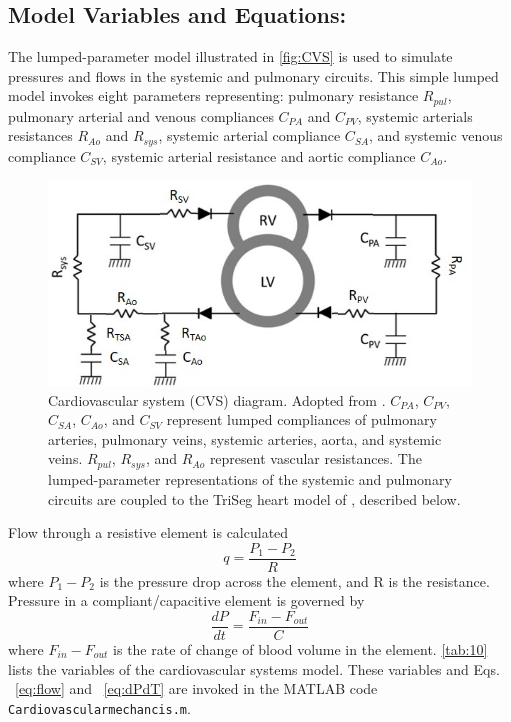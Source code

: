 \documentclass[fleqn,10pt]{physiome}
\begin{document}
\subsection{Model Variables and Equations:}

The lumped-parameter model illustrated in \autoref{fig:CVS} is used to simulate pressures and flows in the systemic and pulmonary circuits. This simple lumped model invokes eight parameters representing: pulmonary resistance $R_{pul}$, pulmonary arterial and venous compliances $C_{PA}$ and $C_{PV}$, systemic arterials resistances $R_{Ao}$ and $R_{sys}$, systemic arterial compliance $C_{SA}$, and systemic venous compliance $C_{SV}$, systemic arterial resistance and aortic compliance $C_{Ao}$. 
\begin{figure}[ht]\centering
\includegraphics[width=0.65\linewidth]{CVS.jpg}
\caption{Cardiovascular system (CVS) diagram. Adopted from \cite{Tewari2016a,Tewari2016b}. $C_{PA}$, $C_{PV}$, $C_{SA}$, $C_{Ao}$, and $C_{SV}$ represent lumped compliances of pulmonary arteries, pulmonary veins, systemic arteries, aorta, and systemic veins. $R_{pul}$, $R_{sys}$, and $R_{Ao}$ represent vascular resistances. The lumped-parameter representations of the systemic and pulmonary circuits are coupled to the TriSeg heart model of \cite{Lumens2009}, described below.}\label{fig:CVS}
\end{figure}

Flow through a resistive element is calculated
\begin{equation}\label{eq:flow}
    q =\frac{P_{1} - P_{2}}{R}
\end{equation}
where $P_{1} - P_{2}$ is the pressure drop across the element, and R is the resistance. Pressure in a compliant/capacitive element is governed by
\begin{equation}\label{eq:dPdT}
    \frac{dP}{dt} =\frac{F_{in} - F_{out}}{C} 
\end{equation}
where $F_{in} - F_{out}$ is the rate of change of blood volume in the element.
\autoref{tab:10} lists the variables of the cardiovascular systems model. These variables and Eqs. ~\ref{eq:flow} and ~\ref{eq:dPdT} are invoked in the MATLAB code \texttt{Cardiovascularmechancis.m}.
\end{document}

